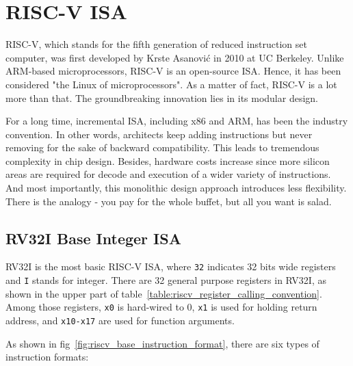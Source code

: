 \section{RISC-V ISA}

RISC-V, which stands for the fifth generation of reduced instruction set computer, was first developed by Krste Asanović in 2010 at UC Berkeley.
Unlike ARM-based microprocessors, RISC-V is an open-source ISA. Hence, it has been considered "the Linux of microprocessors".
As a matter of fact, RISC-V is a lot more than that. The groundbreaking innovation lies in its modular design.

For a long time, incremental ISA, including x86 and ARM, has been the industry convention. In other words, architects keep adding instructions but never removing for the sake of backward compatibility.  
This leads to tremendous complexity in chip design. Besides, hardware costs increase since more silicon areas are required for decode and execution of a wider variety of instructions. And most importantly,
this monolithic design approach introduces less flexibility. There is the analogy - you pay for the whole buffet, but all you want is salad.

\subsection{RV32I Base Integer ISA}
RV32I is the most basic RISC-V ISA, where \texttt{32} indicates 32 bits wide registers and \texttt{I} stands for integer. There are 32 general purpose registers in RV32I, as shown in the upper part of table~\ref{table:riscv_register_calling_convention}. Among those registers, \texttt{x0} is hard-wired to 0, \texttt{x1} is used for holding return address, and \texttt{x10-x17} are used for function arguments.

As shown in fig~\ref{fig:riscv_base_instruction_format}, there are six types of instruction formats:

